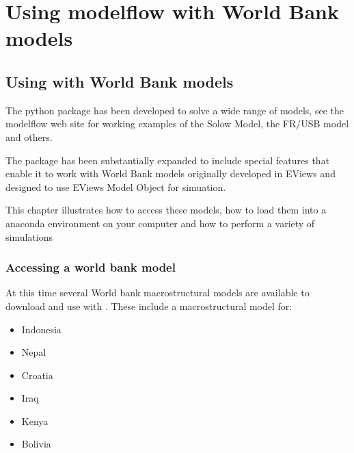 \documentclass[letterpaper,10pt,english]{jupyterBook}
\begin{document}
\part{Using modelflow with World Bank models}

\sphinxstepscope


\chapter{Using  with World Bank models}
\label{\detokenize{content/05_WBModels/LoadingWBModel:using-modelflow-with-world-bank-models}}\label{\detokenize{content/05_WBModels/LoadingWBModel::doc}}
\sphinxAtStartPar
The  python package has been developed to solve a wide range of models, see the modelflow  web site for working examples of the Solow Model, the FR/USB model and others.

\sphinxAtStartPar
The package has been substantially expanded to include special features that enable it to work with World Bank models originally developed in EViews and designed to use EViews Model Object for simuation.

\sphinxAtStartPar
This chapter illustrates how to access these models, how to load them into a  anaconda environment on your computer and how to perform a variety of simulations


\section{Accessing a world bank model}
\label{\detokenize{content/05_WBModels/LoadingWBModel:accessing-a-world-bank-model}}
\sphinxAtStartPar
At this time several World bank macrostructural models are available to download and use with .  These include a macrostructural model for:
\begin{itemize}
\item {} 
\sphinxAtStartPar
Indonesia

\item {} 
\sphinxAtStartPar
Nepal

\item {} 
\sphinxAtStartPar
Croatia

\item {} 
\sphinxAtStartPar
Iraq

\item {} 
\sphinxAtStartPar
Kenya

\item {} 
\sphinxAtStartPar
Bolivia

\end{itemize}
\end{document}
